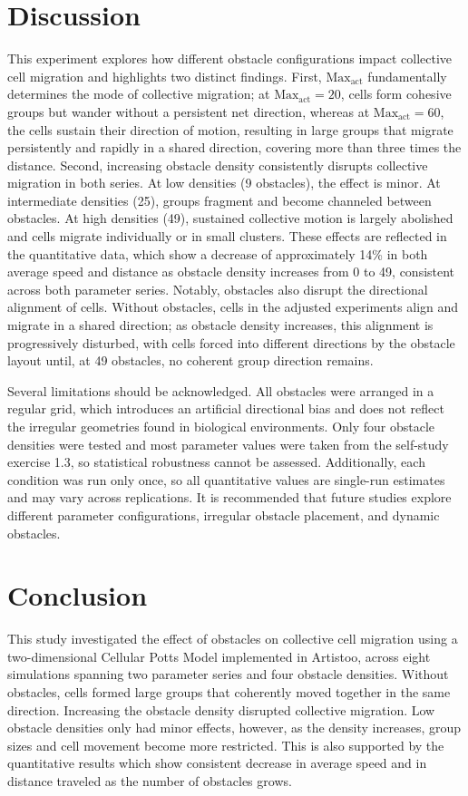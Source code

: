 \documentclass{article}
\begin{document}
\section{Discussion}
This experiment explores how different obstacle configurations impact collective cell migration 
and highlights two distinct findings. First, $\text{Max}_\text{act}$ fundamentally
determines the mode of collective migration; at $\text{Max}_\text{act} = 20$, cells form cohesive
groups but wander without a persistent net direction, whereas at $\text{Max}_\text{act} = 60$, the 
cells sustain their direction of motion, resulting in large groups that migrate persistently and 
rapidly in a shared direction, covering more than three times the distance. Second, increasing 
obstacle density consistently disrupts collective migration in both
series. At low densities (9 obstacles), the effect is minor. At intermediate densities (25), groups
fragment and become channeled between obstacles. At high densities (49), sustained collective motion
is largely abolished and cells migrate individually or in small clusters. These effects are reflected
in the quantitative data, which show a decrease of approximately 14\% in both average
speed and distance as obstacle density increases from 0 to 49, consistent across both parameter
series. Notably, obstacles also disrupt the directional alignment of cells. Without obstacles, cells in the adjusted experiments align and migrate in a shared direction; as obstacle density increases, this alignment is progressively disturbed, with cells forced into different directions by the obstacle layout until, at 49 obstacles, no coherent group direction remains.

Several limitations should be acknowledged. All obstacles were arranged in a regular grid, which
introduces an artificial directional bias and does not reflect the irregular geometries found in
biological environments. Only four obstacle densities were tested and most parameter values were
taken from the self-study exercise 1.3, so statistical robustness cannot be assessed. Additionally, each condition was run only once, so all quantitative values are single-run estimates and may vary across replications.
It is recommended that future studies explore different parameter configurations, irregular obstacle 
placement, and dynamic obstacles. 

\section{Conclusion}
This study investigated the effect of obstacles on collective cell migration using a two-dimensional 
Cellular Potts Model implemented in Artistoo, across eight simulations spanning two parameter series 
and four obstacle densities. Without obstacles, cells formed large groups that coherently moved together 
in the same direction. Increasing the obstacle density disrupted collective migration. Low obstacle 
densities only had minor effects, however, as the density increases, group sizes and cell movement become 
more restricted. This is also supported by the quantitative results which show consistent decrease in 
average speed and in distance traveled as the number of obstacles grows.
\end{document}
